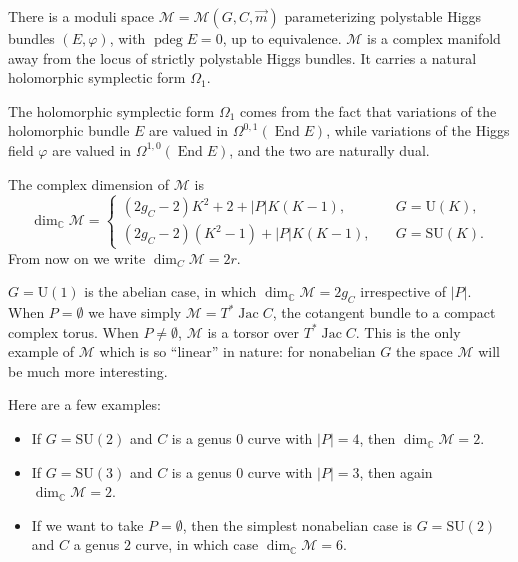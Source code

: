 \documentclass[12pt,letterpaper,reqno]{article}
\numberwithin{equation}{section}
\newcommand{\cM}{\ensuremath{\mathcal M}}
\newcommand{\C}{\ensuremath{\mathbb C}}
\newcommand{\abs}[1]{\lvert#1\rvert}
\DeclareMathOperator{\End}{End}
\DeclareMathOperator{\Jac}{Jac}
\DeclareMathOperator{\pdeg}{pdeg}
\newcommand{\SU}{\mathrm{SU}}
\newcommand{\U}{\mathrm{U}}
\newcommand{\fixme}[1]{{\color{orange}{[#1]}}}
\begin{document}
\begin{prop}
There is a moduli space $\cM = \cM(G,C,\vec{m})$ parameterizing
polystable Higgs bundles $(E,\varphi)$, with $\pdeg E = 0$, 
up to equivalence. 
$\cM$ is a complex manifold away
from the locus of strictly polystable Higgs bundles.
It carries a natural holomorphic symplectic form $\Omega_1$.
\end{prop}


The holomorphic symplectic form 
$\Omega_1$ comes from the fact that variations of the
holomorphic bundle $E$ are valued in $\Omega^{0,1}(\End E)$,
while variations of the Higgs field $\varphi$ are
valued in $\Omega^{1,0}(\End E)$,
and the two are naturally dual. \fixme{with some care
around punctures}


\begin{remark}[Dimension of $\cM$]
The complex dimension of $\cM$ is
\begin{equation} \label{eq:dim-M}
  \dim_\C \cM = \begin{cases} (2g_C-2) K^2 + 2 + \abs{P} K(K-1), & \quad G = \U(K), \\ (2g_C-2) (K^2-1) + \abs{P} K(K-1), & \quad G = \SU(K). \end{cases}
\end{equation}
From now on we write $\dim_C \cM = 2r$.
\end{remark}


\begin{example}
$G = \U(1)$ is the abelian case, in which $\dim_\C \cM = 2g_C$ irrespective
of $\abs{P}$. When $P = \emptyset$ we have simply $\cM = T^* \Jac C$, the cotangent
bundle to a compact complex torus. When $P \neq \emptyset$, $\cM$ is a torsor
over $T^* \Jac C$.
This is the only example of $\cM$ which is so ``linear'' in nature:
for nonabelian $G$ the space $\cM$ will be much more interesting.
\end{example}

\begin{example} Here are a few examples:
\begin{itemize}
\item If $G = \SU(2)$ and $C$ is a genus $0$ curve with $\abs{P} = 4$,
then $\dim_\C \cM = 2$.
\item If $G = \SU(3)$
and $C$ is a genus $0$ curve with $\abs{P}=3$,
then again $\dim_\C \cM = 2$.
\item If we want to take $P = \emptyset$,
then the simplest nonabelian case is
$G = \SU(2)$ and $C$ a genus $2$ curve, in which case
$\dim_\C \cM = 6$. 
\end{itemize}
\end{example}
\end{document}
